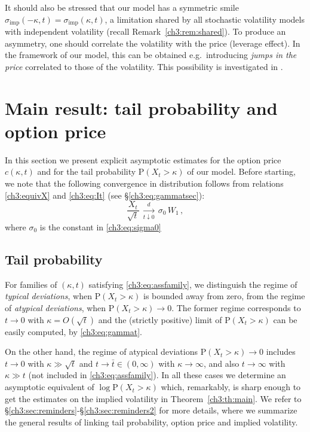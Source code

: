 \documentclass[a4paper,reqno,11pt]{amsart}
\numberwithin{equation}{section}
\newcommand{\PEfont}{\mathrm}
\renewcommand{\P}{\ensuremath{\PEfont P}}
\newcommand\imp{\mathrm{imp}}
\begin{document}
\smallskip

It should also be stressed that our model has a symmetric smile 
$\sigma_\imp(-\kappa,t) = \sigma_\imp(\kappa,t)$,
a limitation shared by 
all stochastic volatility
models with independent volatility (recall Remark~\ref{ch3:rem:shared}).
To produce an asymmetry, one should correlate the volatility with
the price (leverage effect). In the framework of our model, 
this can be obtained e.g.\ introducing \emph{jumps in the price} correlated to
those of the volatility. This possibility is investigated in \cite{cf:C}.


\section{Main result: tail probability and option price}
\label{ch3:sec:pricetail}

In this section we present explicit asymptotic estimates
for the option price $c(\kappa,t)$
and for the tail probability $\P(X_t > \kappa)$ of our model.
Before starting, we note that 
the following convergence in distribution follows
from relations \eqref{ch3:equivX} and \eqref{ch3:eq:It}
(see \S\ref{ch3:eq:gammatsec}):
\begin{equation} \label{ch3:eq:gammat}
	\frac{X_t}{\sqrt{t}} \, \xrightarrow[t \downarrow 0]{d} \,
	\sigma_0 \, W_1 \,,
\end{equation}
where $\sigma_0$ is the constant in \eqref{ch3:eq:sigma0}


\subsection{Tail probability}
For families of $(\kappa,t)$ satisfying \eqref{ch3:eq:assfamily},
we distinguish the regime of \emph{typical deviations},
when $\P(X_t > \kappa)$ is bounded away from zero,
from the regime of \emph{atypical deviations},
when $\P(X_t > \kappa) \to 0$. The former regime corresponds
to $t\to 0$ with $\kappa= O(\sqrt{t})$ and the (strictly positive) limit
of $\P(X_t > \kappa)$ can be easily computed, by \eqref{ch3:eq:gammat}.

On the other hand, the regime of atypical deviations
$\P(X_t > \kappa) \to 0$ includes $t\to 0$ with $\kappa \gg \sqrt{t}$
and $t \to \bar t \in (0,\infty)$ with $\kappa \to \infty$,
and also $t\to\infty$ with $\kappa\gg t$ (not
included in \eqref{ch3:eq:assfamily}).
In all these cases we determine 
an asymptotic equivalent of $\log \P(X_t > \kappa)$
which, remarkably, is sharp enough to get the estimates
on the implied volatility in Theorem~\ref{ch3:th:main}.
We refer to \S\ref{ch3:sec:reminders}-\S\ref{ch3:sec:reminders2} for more details,
where we summarize the general results of \cite{cf:CC} linking tail probability,
option price and implied volatility.
\end{document}
